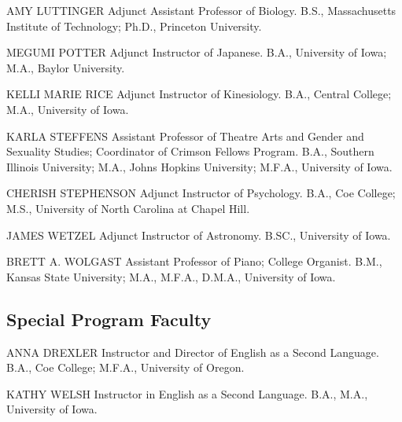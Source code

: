 \documentclass[
  letterpaper,
]{scrbook}
\begin{document}
AMY LUTTINGER Adjunct Assistant Professor of Biology. B.S.,
Massachusetts Institute of Technology; Ph.D., Princeton University.

MEGUMI POTTER Adjunct Instructor of Japanese. B.A., University of Iowa;
M.A., Baylor University.

KELLI MARIE RICE Adjunct Instructor of Kinesiology. B.A., Central
College; M.A., University of Iowa.

KARLA STEFFENS Assistant Professor of Theatre Arts and Gender and
Sexuality Studies; Coordinator of Crimson Fellows Program. B.A.,
Southern Illinois University; M.A., Johns Hopkins University; M.F.A.,
University of Iowa.

CHERISH STEPHENSON Adjunct Instructor of Psychology. B.A., Coe College;
M.S., University of North Carolina at Chapel Hill.

JAMES WETZEL Adjunct Instructor of Astronomy. B.SC., University of Iowa.

BRETT A. WOLGAST Assistant Professor of Piano; College Organist. B.M.,
Kansas State University; M.A., M.F.A., D.M.A., University of Iowa.

\hypertarget{special-program-faculty}{%
\subsection{Special Program Faculty}\label{special-program-faculty}}

ANNA DREXLER Instructor and Director of English as a Second Language.
B.A., Coe College; M.F.A., University of Oregon.

KATHY WELSH Instructor in English as a Second Language. B.A., M.A.,
University of Iowa.

\backmatter
\printindex
\end{document}
